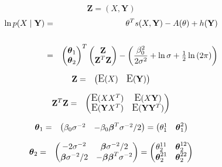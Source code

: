 \documentclass[11pt, oneside]{article}   	%
\newcommand{\bm}{\mathbf}
\newcommand{\bs}{\boldsymbol}
\DeclareMathOperator*{\E}{\mbox{\large E}}
\numberwithin{figure}{section}
\numberwithin{equation}{section}
\numberwithin{table}{section}
\theoremstyle{definition}
\begin{document}
\begin{appendices}
\begin{itemize}
$$\bm Z = ( X, \bm Y)$$
\begin{eqnarray*}
\ln p(X \mid \mathbf{Y}) &=& \theta^T s(X,\mathbf{Y}) - A(\theta) + h(\mathbf{Y})\\\\
&=&
\begin{pmatrix}
\thb_1 \\
\thb_2 \\
\end{pmatrix}^T
\begin{pmatrix}
\Z   \\
\Z^T\Z   \\
\end{pmatrix}
- \left( \frac{\beta_0^2}{2\sigma^2} + \ln{\sigma} + \tfrac{1}{2}\ln{(2\pi)}\right)
\end{eqnarray*}




\begin{eqnarray*}
\Z &=& 
\begin{pmatrix}
\E(X) & \E(\Y)
\end{pmatrix}
\end{eqnarray*}

\begin{eqnarray*}
\Z^T\Z &=& 
\begin{pmatrix}
\E(XX^T)   & \E(X\Y) \\
\E(\Y X^T) & \E(\Y \Y^T)
\end{pmatrix}
\end{eqnarray*}

\begin{eqnarray*}
\thb_1 &=& 
\begin{pmatrix}
\beta_0\sigma^{-2} & -\beta_0\beb^T\sigma^{-2}/2
\end{pmatrix}
=
\begin{pmatrix}
\theta_1^1 & \thb_1^2
\end{pmatrix}
\end{eqnarray*}

\begin{eqnarray*}
\thb_2 &=& 
\begin{pmatrix}
-2\sigma^{-2}   &  \beb \sigma^{-2}/2\\
\beb \sigma^{-2}/2   & -\beb \beb^T \sigma^{-2}
\end{pmatrix}
= 
\begin{pmatrix}
\theta_2^{11}   &  \thb_2^{12} \\
\thb_2^{21}   &  \thb_2^{22}
\end{pmatrix}
\end{eqnarray*}


\end{itemize}
\end{appendices}
\end{document}
